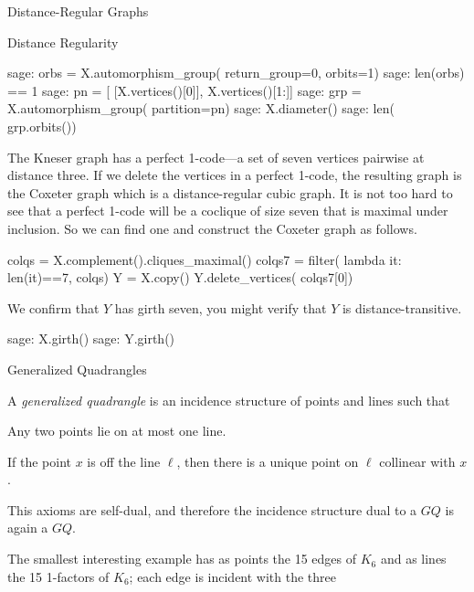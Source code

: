 \begin{chap}{Distance-Regular Graphs}
\begin{sect}{Distance Regularity}
\begin{sageexample}
sage: orbs = X.automorphism_group( return_group=0, orbits=1)
sage: len(orbs) == 1 
sage: pn = [ [X.vertices()[0]], X.vertices()[1:]]
sage: grp = X.automorphism_group( partition=pn)
sage: X.diameter()
sage: len( grp.orbits())
\end{sageexample}
%
\begin{para}
The Kneser graph has a perfect 1-code---a set of seven vertices pairwise at distance
three. If we delete the vertices in a perfect 1-code, the resulting graph
is the Coxeter graph which is a distance-regular cubic graph.
It is not too hard to see that a perfect 1-code will be a coclique of size seven
that is maximal under inclusion. So we can find one and construct the
Coxeter graph as follows.
\end{para}
%
\begin{sageblock}
    colqs = X.complement().cliques_maximal()
    colqs7 = filter( lambda it: len(it)==7, colqs)
    Y = X.copy()
    Y.delete_vertices( colqs7[0])
\end{sageblock}
%
\begin{para}
We confirm that $Y$ has girth seven, you might verify that $Y$ is distance-transitive.
\end{para}
%
\begin{sageexample}
sage: X.girth()
sage: Y.girth()
\end{sageexample}
%
\end{sect}
%
\begin{sect}{Generalized Quadrangles}
%
\begin{para}
A \textsl{generalized quadrangle} is an incidence structure of points
and lines such that
\end{para}
%
\begin{enumerate}
    \begin{listitem}
    Any two points lie on at most one line.
    \end{listitem}
    \begin{listitem}
    If the point $x$ is off the line $\ell$, then there is a unique
    point on $\ell$ collinear with $x$.
    \end{listitem}
\end{enumerate}
%
\begin{para}
This axioms are self-dual, and therefore the incidence structure
dual to a $GQ$ is again a $GQ$.
\end{para}
%
\begin{para}
The smallest interesting example has as points the 15 edges of $K_6$ and
as lines the 15 1-factors of $K_6$; each edge is incident with the three

\end{para}
\end{sect}
\end{chap}

